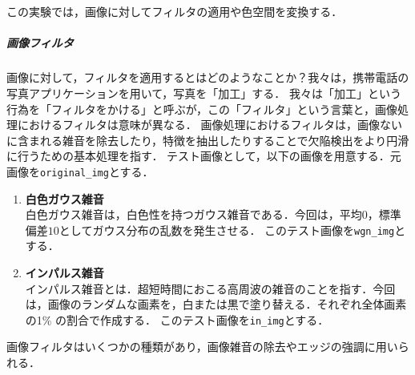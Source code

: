 \chapter{\kadaib}
\section{\purpose}
この実験では，画像に対してフィルタの適用や色空間を変換する．\par
\paragraph{画像フィルタ} 画像に対して，フィルタを適用するとはどのようなことか？我々は，携帯電話の写真アプリケーションを用いて，写真を「加工」する．
我々は「加工」という行為を「フィルタをかける」と呼ぶが，この「フィルタ」という言葉と，画像処理におけるフィルタは意味が異なる．
画像処理におけるフィルタは，画像ないに含まれる雑音を除去したり，特徴を抽出したりすることで欠陥検出をより円滑に行うための基本処理を指す\cite{画像フィルタ}．
\newcommand{\originimg}{\texttt{original\_img}}
テスト画像として，以下の画像を用意する．元画像を\originimg とする．
\setlength{\columnseprule}{0.1mm}
\begin{enumerate}
    \item \textbf{白色ガウス雑音}\\
          \newcommand{\wgnimg}{\texttt{wgn\_img}}
          白色ガウス雑音は，白色性を持つガウス雑音である．今回は，平均\(0\)，標準偏差\(10\)としてガウス分布の乱数を発生させる．
          このテスト画像を\wgnimg とする．
    \item \textbf{インパルス雑音}\\
          \newcommand{\inimg}{\texttt{in\_img}}
          インパルス雑音とは．超短時間におこる高周波の雑音のことを指す．今回は，画像のランダムな画素を，白または黒で塗り替える．それぞれ全体画素の1\% の割合で作成する．
          このテスト画像を\inimg とする．
\end{enumerate}
画像フィルタはいくつかの種類があり，画像雑音の除去やエッジの強調に用いられる．
